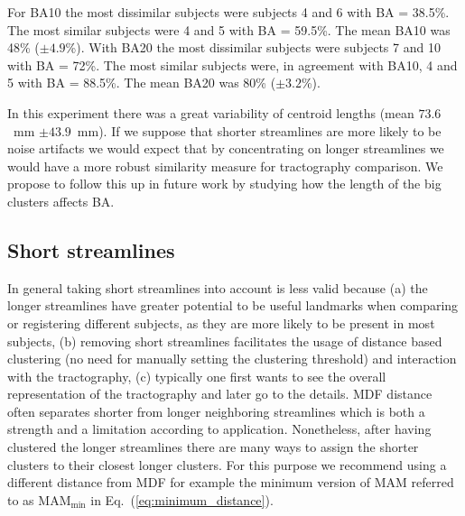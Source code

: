 \documentclass{bioinfo}
\begin{document}
For BA10 the most dissimilar subjects were subjects 4 and 6 with BA =
38.5\%. The most similar subjects were 4 and 5 with BA = 59.5\%. The
mean BA10 was 48\% ($\pm\num{4.9}$\%). With BA20 the most dissimilar
subjects were subjects 7 and 10 with BA = 72\%. The most similar
subjects were, in agreement with BA10, 4 and 5 with BA = 88.5\%. The
mean BA20 was 80\% ($\pm\num{3.2}$\%).

In this experiment there was a great variability of centroid lengths
(mean $73.6$~mm $\pm\num{43.9}$~mm). If we suppose that shorter
streamlines are more likely to be noise artifacts we would expect that
by concentrating on longer streamlines we would have a more robust
similarity measure for tractography comparison. We propose to follow
this up in future work by studying how the length of the big clusters
affects BA.

\subsection{Short streamlines\label{sub:short_tracks}}

In general taking short streamlines into account is less valid because
(a) the longer streamlines have greater potential to be useful landmarks
when comparing or registering different subjects, as they are more
likely to be present in most subjects, (b) removing short streamlines
facilitates the usage of distance based clustering (no need for manually
setting the clustering threshold) and interaction with the tractography,
(c) typically one first wants to see the overall representation of the
tractography and later go to the details. MDF distance often separates
shorter from longer neighboring streamlines which is both a strength and
a limitation according to application. Nonetheless, after having
clustered the longer streamlines there are many ways to assign the
shorter clusters to their closest longer clusters. For this purpose we
recommend using a different distance from MDF for example the minimum
version of MAM referred to as $\textrm{MAM}_{\textrm{min}}$ in
Eq.~(\ref{eq:minimum_distance}).
\end{document}
